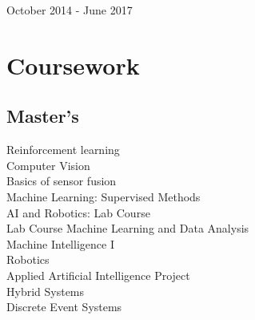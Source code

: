 \documentclass[]{deedy-resume-openfont}
\begin{document}
\begin{minipage}[t]{0.4\textwidth}
October 2014 - June 2017 \\
\sectionsep


\section{Coursework}
\subsection{Master's}
	\textbullet{}Reinforcement learning  \\
	\textbullet{}Computer Vision \\
	\textbullet{}Basics of sensor fusion\\
	\textbullet{}Machine Learning: Supervised Methods\\
	\textbullet{}AI and Robotics: Lab Course \\
	\textbullet{}Lab Course Machine Learning and Data Analysis\\
	\textbullet{}Machine Intelligence I \\
	\textbullet{}Robotics \\
	\textbullet{}Applied Artificial Intelligence Project \\
	\textbullet{}Hybrid Systems\\
	\textbullet{}Discrete Event Systems
\sectionsep













\end{minipage}
\end{document}
